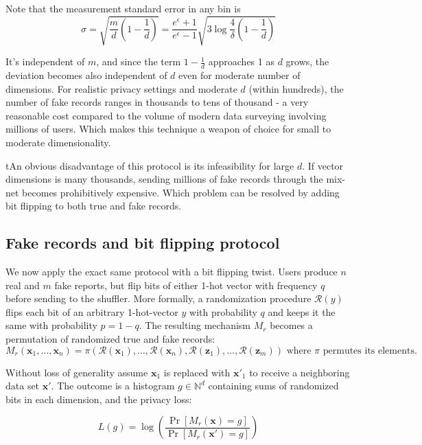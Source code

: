 \documentclass[11pt]{article}
\newcommand{\bbx}{\pmb{x}}
\newcommand{\bbz}{\pmb{z}}
\newcommand{\cR}{\mathcal{R}}
\newcommand{\N}{\mathbb{N}}
\begin{document}
Note that the measurement standard error in any bin is 
\[  \sigma = \sqrt{\frac{m}{d}(1 - \frac{1}{d})} =  \frac{e^\epsilon +1}{e^\epsilon - 1} \sqrt{  3 \log {\frac{4}{\delta}} (1 - \frac{1}{d})}\] 

It's independent of $m$, and since the term $ 1 - \frac{1}{d}$ approaches 1 as $d$ grows, the deviation becomes also independent of $d$ even for moderate number of dimensions.   For realistic privacy settings and moderate $d$ (within hundreds), the number of fake records ranges in thousands to tens of thousand - a very reasonable cost compared to the volume of modern data surveying involving millions of users.  Which makes this technique a weapon of choice for small to moderate dimensionality. 


tAn obvious disadvantage of this protocol is its infeasibility for large $d$. If vector dimensions is many thousands, sending millions of fake records through the mix-net becomes prohibitively expensive.  Which problem can be resolved by adding bit flipping to both true and fake records.


\subsection{Fake records and bit flipping protocol}

We now apply the exact same protocol with a bit flipping twist. Users produce $n$ real and $m$ fake reports, but flip bits of either 1-hot vector with frequency $q$ before sending to the shuffler.  More formally, a randomization procedure $\cR(y)$ flips each bit of an arbitrary 1-hot-vector $y$ with probability $q$ and keeps it the same with probability $p=1-q$.  The resulting mechanism $M_r$ becomes a permutation of randomized true and fake records:
\[
M_r(\bbx_1,  \dots , \bbx_n) = \pi (\cR(\bbx_1), \dots , \cR(\bbx_n), \cR(\bbz_1), \dots , \cR(\bbz_m)) \text{ where } \pi \text{ permutes its elements}. 
\]

Without loss of generality assume $\bbx_1$ is replaced with $\bbx'_1$ to receive a neighboring data set $\bbx'$.  The outcome is a histogram $g \in \N^d$ containing sums of randomized bits in each dimension, and the privacy loss:

\begin{equation} \label{eq:lgbound}
L(g) = \log \left ( \frac{\Pr[M_r(\bbx) = g]}{\Pr[M_r(\bbx') = g]} \right )
\end{equation}
\end{document}
